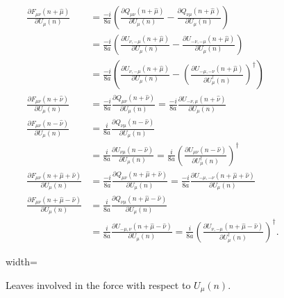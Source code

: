 	\begin{align}
		\frac{\partial F_{\mu\nu}(n+\hat{\mu})}{\partial U_\mu(n)}&=
		\frac{-i}{8a}\left(\frac{\partial Q_{\mu\nu}\left(n+\hat{\mu}\right)}{\partial U_\mu(n)}-\frac{\partial
		Q_{\nu\mu}\left(n+\hat{\mu}\right)}{\partial U_\mu(n)}\right)\nonumber\\
		&=\frac{-i}{8a}\left(\frac{\partial U_{\nu,-\mu}\left(n+\hat{\mu}\right)}{\partial U_\mu(n)}
		-\frac{\partial U_{-\nu,-\mu}\left(n+\hat{\mu}\right)}{\partial U_\mu(n)}\right)\nonumber\\
		&=\frac{-i}{8a}\left(\frac{\partial U_{\nu,-\mu}\left(n+\hat{\mu}\right)}{\partial U_\mu(n)}
		-\left(\frac{\partial U_{-\mu,-\nu}\left(n+\hat{\mu}\right)}{\partial U^\dagger_\mu(n)}\right)^\dagger\right)\label{Eq:Clov_Force_2}\\
		\frac{\partial F_{\mu\nu}\left(n+\hat{\nu}\right)}{\partial U_\mu(n)}&=
			\frac{-i}{8a}\frac{\partial Q_{\mu\nu}\left(n+\hat{\nu}\right)}{\partial U_\mu(n)}=
			\frac{-i}{8a}\frac{\partial U_{-\nu,\mu}\left(n+\hat{\nu}\right)}{\partial U_\mu(n)}\label{Eq:Clov_Force_3}\\
		\frac{\partial F_{\mu\nu}\left(n-\hat{\nu}\right)}{\partial U_\mu(n)}&=
			\frac{i}{8a}\frac{\partial Q_{\nu\mu}\left(n-\hat{\nu}\right)}{\partial U_\mu(n)}\nonumber\\
			&=\frac{i}{8a}\frac{\partial U_{\nu\mu}\left(n-\hat{\nu}\right)}{\partial U_\mu(n)}=
			\frac{i}{8a}\left(\frac{\partial U_{\mu\nu}\left(n-\hat{\nu}\right)}
			{\partial U^\dagger_\mu(n)}\right)^\dagger\label{Eq:Clov_Force_4}\\
		\frac{\partial F_{\mu\nu}\left(n+\hat{\mu}+\hat{\nu}\right)}{\partial U_\mu(n)}&=
			\frac{-i}{8a}\frac{\partial Q_{\mu\nu}\left(n+\hat{\mu}+\hat{\nu}\right)}{\partial U_\mu(n)}=
			\frac{-i}{8a}\frac{\partial U_{-\mu,-\nu}\left(n+\hat{\mu}+\hat{\nu}\right)}{\partial U_\mu(n)}\label{Eq:Clov_Force_5}\\
		\frac{\partial F_{\mu\nu}\left(n+\hat{\mu}-\hat{\nu}\right)}{\partial U_\mu(n)}&=
			\frac{i}{8a}\frac{\partial Q_{\nu\mu}\left(n+\hat{\mu}-\hat{\nu}\right)}{\partial U_\mu(n)}\nonumber\\
			&=\frac{i}{8a}\frac{\partial U_{-\mu,\nu}\left(n+\hat{\mu}-\hat{\nu}\right)}{\partial U_\mu(n)}
			=\frac{i}{8a}\left(\frac{\partial U_{\nu,-\mu}\left(n+\hat{\mu}-\hat{\nu}\right)}
			{\partial U^\dagger_\mu(n)}\right)^\dagger\label{Eq:Clov_Force_6}\text{.}
	\end{align}
	\begin{figure}
		\centring
		\begin{adjustbox}{width=\linewidth}
		\end{adjustbox}
		\captionsetup{width=\linewidth}
		\caption{Leaves involved in the force with respect to $U_\mu(n)$.}
		\label{Tikz:Clover_Force_Comp}
	\end{figure}
	
